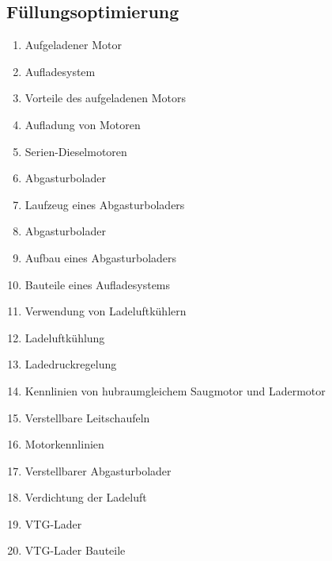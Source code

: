 \subsection{Füllungsoptimierung}\label{fuellungsoptimierung-1}

\begin{enumerate}
\item
  Aufgeladener Motor\\
\item
  Aufladesystem\\
\item
  Vorteile des aufgeladenen Motors\\
\item
  Aufladung von Motoren\\
\item
  Serien-Dieselmotoren\\
\item
  Abgasturbolader\\
\item
  Laufzeug eines Abgasturboladers\\
\item
  Abgasturbolader\\
\item
  Aufbau eines Abgasturboladers\\
\item
  Bauteile eines Aufladesystems\\
\item
  Verwendung von Ladeluftkühlern\\
\item
  Ladeluftkühlung\\
\item
  Ladedruckregelung\\
\item
  Kennlinien von hubraumgleichem Saugmotor und Ladermotor\\
\item
  Verstellbare Leitschaufeln\\
\item
  Motorkennlinien\\
\item
  Verstellbarer Abgasturbolader\\
\item
  Verdichtung der Ladeluft\\
\item
  VTG-Lader\\
\item
  VTG-Lader Bauteile\\

\end{enumerate}
